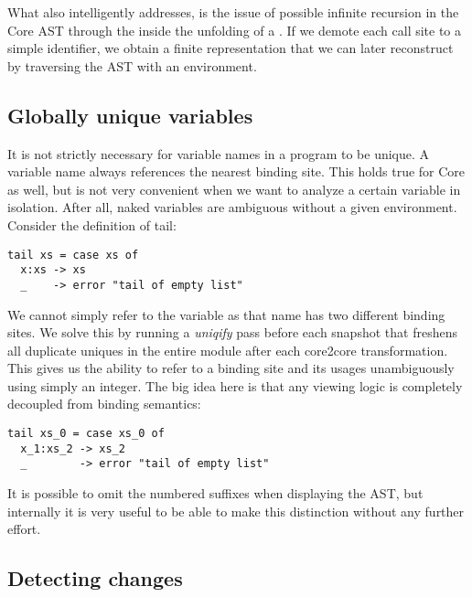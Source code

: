 What  also intelligently addresses, is the issue of possible infinite recursion
in the Core AST through the  inside the unfolding of a . If we demote each
call site to a simple identifier, we obtain a finite representation that we can later reconstruct by traversing
the AST with an environment.

\subsection{Globally unique variables}

It is not strictly necessary for variable names in a program to be unique. A variable name always
references the nearest binding site. This holds true for Core as well, but is not very convenient
when we want to analyze a certain variable in isolation. After all, naked variables are ambiguous without a given
environment. Consider the definition of tail:

\begin{listing}[H]
\begin{verbatim}
tail xs = case xs of
  x:xs -> xs
  _    -> error "tail of empty list"
\end{verbatim}
\end{listing}

We cannot simply refer to the variable  as that name has two different binding sites.
We solve this by running a \textit{uniqify} pass before each snapshot that freshens all duplicate uniques in the entire
module after each core2core transformation. This gives us the ability to refer to a binding site and its usages unambiguously using simply an integer.
The big idea here is that any viewing logic is completely decoupled from binding semantics:

\begin{listing}[H]
\begin{verbatim}
tail xs_0 = case xs_0 of
  x_1:xs_2 -> xs_2
  _        -> error "tail of empty list"
\end{verbatim}
\end{listing}

It is possible to omit the numbered suffixes when displaying the AST, but internally it is very useful to be able to make
this distinction without any further effort.

\subsection{Detecting changes}

